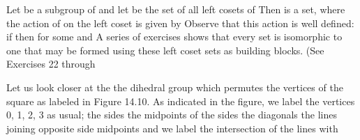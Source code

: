 \documentclass[11pt,oneside]{article}
\begin{document}
\begin{BookBody}
 Let  be a subgroup of  and let  be the set of all left cosets of  Then  is a set, where the action of  on the left coset  is given by  Observe that this action is well defined: if  then  for some  and  A series of exercises shows that every set is isomorphic to one that may be formed using these left coset sets as building blocks. (See Exercises 22 through \BookEnd{\blacktriangle}

 Let us look closer at the the dihedral group  which permutes the vertices of the square as labeled in Figure 14.10. As indicated in the figure, we label the vertices 0, 1, 2, 3 as usual; the sides  the midpoints of the sides  the diagonals  the lines joining opposite side midpoints  and we label the intersection of the lines  with 

\end{BookBody}

\BookNarrativetrue
\end{document}
